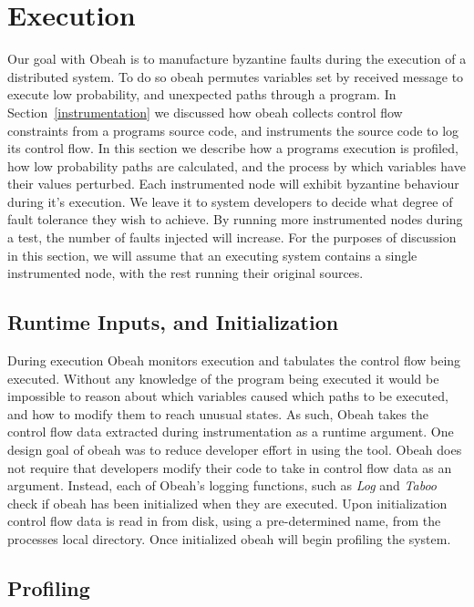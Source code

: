 \section{Execution}
\label{sec:execution}

Our goal with Obeah is to manufacture byzantine faults during the execution of
a distributed system. To do so obeah permutes variables set by received message
to execute low probability, and unexpected paths through a program. In
Section~\ref{instrumentation} we discussed how obeah collects control flow
constraints from a programs source code, and instruments the source code to log
its control flow. In this section we describe how a programs execution is
profiled, how low probability paths are calculated, and the process by which
variables have their values perturbed.  Each instrumented node will exhibit
byzantine behaviour during it's execution. We leave it to system developers to
decide what degree of fault tolerance they wish to achieve. By running more
instrumented nodes during a test, the number of faults injected will increase.
For the purposes of discussion in this section, we will assume that an
executing system contains a single instrumented node, with the rest running
their original sources.

\subsection{Runtime Inputs, and Initialization}

During execution Obeah monitors execution and tabulates the control flow being
executed. Without any knowledge of the program being executed it would be
impossible to reason about which variables caused which paths to be executed,
and how to modify them to reach unusual states. As such, Obeah takes the control
flow data extracted during instrumentation as a runtime argument. One design
goal of obeah was to reduce developer effort in using the tool. Obeah does not
require that developers modify their code to take in control flow data as an
argument. Instead, each of Obeah's logging functions, such as \emph{Log} and
\emph{Taboo} check if obeah has been initialized when they are executed. Upon
initialization control flow data is read in from disk, using a pre-determined
name, from the processes local directory. Once initialized obeah will begin
profiling the system.

\subsection{Profiling}

